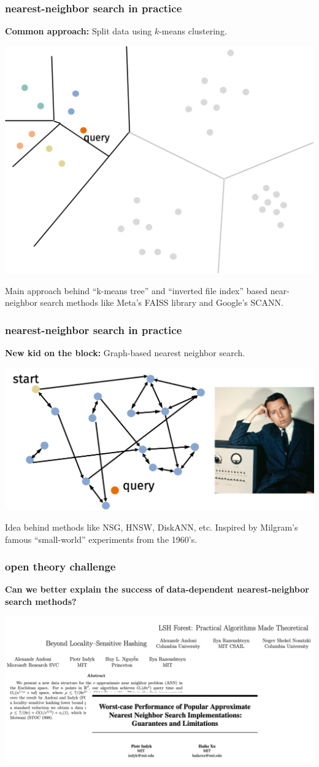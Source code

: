 \documentclass[compress]{beamer}
\begin{document}
\begin{frame}[t]
	\frametitle{nearest-neighbor search in practice}
	\textbf{Common approach:} Split data using $k$-means clustering. 
	\begin{center}
	\includegraphics[width=.6\textwidth]{kmeans_2.png}
	\end{center}
	Main approach behind ``k-means tree'' and ``inverted file index'' based near-neighbor search methods like Meta's FAISS library and Google's SCANN. 
\end{frame}

\begin{frame}[t]
	\frametitle{nearest-neighbor search in practice}
	\textbf{New kid on the block:} Graph-based nearest neighbor search.
	\begin{center}
		\includegraphics[width=\textwidth]{search_graph.png}
		\end{center}
Idea behind methods like NSG, HNSW, DiskANN, etc. Inspired by Milgram's famous ``small-world'' experiments from the 1960's. 
\end{frame}

\begin{frame}[t]
	\frametitle{open theory challenge}
	\textbf{Can we better explain the success of data-dependent nearest-neighbor search methods?}
	\begin{center}
		\includegraphics[width=\textwidth]{new_theory.png}
	\end{center}
\end{frame}
\end{document}
